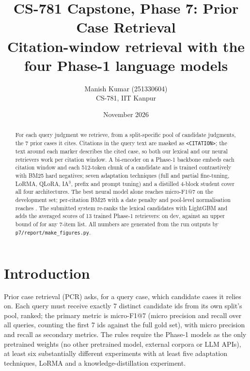 \documentclass[11pt,a4paper]{article}
\title{\textbf{CS-781 Capstone, Phase 7: Prior Case Retrieval}\\[2pt]
\large Citation-window retrieval with the four Phase-1 language models}
\author{Manish Kumar (251330604)\\ CS-781, IIT Kanpur}
\date{November 2026}
\newcommand{\code}[1]{\texttt{\small #1}}
\begin{document}
\maketitle

\begin{abstract}
\noindent For each query judgment we retrieve, from a split-specific pool of candidate judgments, the 7 prior
cases it cites.  Citations in the query text are masked as \code{<CITATION>}; the text around each marker
describes the cited case, so both our lexical and our neural retrievers work per citation window.  A
bi-encoder on a Phase-1 backbone embeds each citation window and each 512-token chunk of a candidate and is
trained contrastively with BM25 hard negatives; seven adaptation techniques (full and partial fine-tuning,
LoRMA, QLoRA, IA$^3$, prefix and prompt tuning) and a distilled 4-block student cover all four architectures.
The best neural model alone reaches micro-F1@7 \nfEtwo{} on the development set; per-citation BM25 with a
date penalty and pool-level normalisation reaches \ladfive.  The submitted system re-ranks the lexical
candidates with LightGBM and adds the averaged scores of 13 trained Phase-1 retrievers: \stksix{} on dev,
against an upper bound of \oracledev{} for any 7-item list.  All numbers are generated from the run outputs by
\code{p7/report/make\_figures.py}.
\end{abstract}

\tableofcontents
\newpage

\section{Introduction}
Prior case retrieval (PCR) asks, for a query case, which candidate cases it relies on.  Each query must receive
exactly 7 distinct candidate ids from its own split's pool, ranked; the primary metric is micro-F1@7 (micro
precision and recall over all queries, counting the first 7 ids against the full gold set), with micro
precision and recall as secondary metrics.  The rules require the Phase-1 models as the only pretrained weights
(no other pretrained model, external corpora or LLM APIs), at least six substantially different experiments
with at least five adaptation techniques, LoRMA and a knowledge-distillation experiment.

\end{document}
